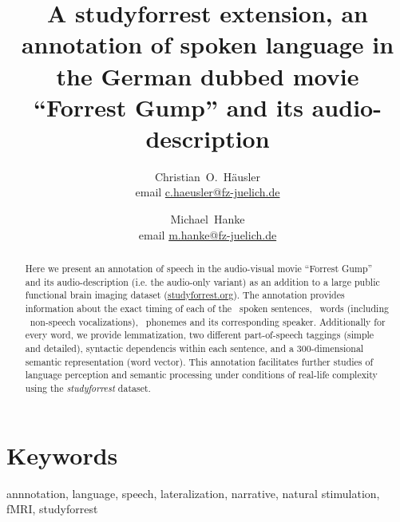 \documentclass[10pt,a4paper,onecolumn]{article}
\begin{document}



\title{A studyforrest extension, an annotation of spoken language in the German dubbed movie ``Forrest Gump'' and its audio-description}

\author[1, 2]{Christian~O.~Häusler \\ email \href{mailto:c.haeusler@fz-juelich.de}{c.haeusler@fz-juelich.de} }
\author[1, 2]{Michael~Hanke \\ email \href{mailto:m.hanke@fz-juelich.de}{m.hanke@fz-juelich.de} }


\maketitle


\thispagestyle{fancy}
\begin{abstract}
Here we present an annotation of speech in the audio-visual movie ``Forrest Gump'' and its audio-description (i.e. the audio-only variant) as an addition to a large public functional brain imaging dataset (\href{www.studyforrest.org}{studyforrest.org}).
The annotation provides information about the exact timing of each of the \aSentencesAll\ spoken sentences, \aWordsAll\ words (including \aPosNonspeechAll\ non-speech vocalizations), \aPhonesAll\ phonemes and its corresponding speaker.
Additionally for every word, we provide lemmatization, two different part-of-speech taggings (simple and detailed), syntactic dependencis within each sentence, and a 300-dimensional semantic representation (word vector).
This annotation facilitates further studies of language perception and semantic processing under conditions of real-life complexity using the \textit{studyforrest} dataset.
\end{abstract}

\section*{Keywords}
annnotation, language, speech, lateralization, narrative, natural stimulation, fMRI, studyforrest
\end{document}
